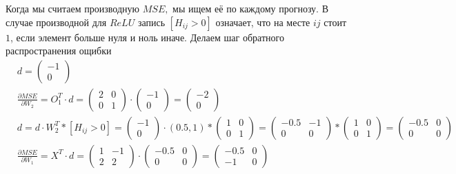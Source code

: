 \begin{sol}
Когда мы считаем производную $MSE,$ мы ищем её по каждому прогнозу. В случае производной для $ReLU$ запись $[H_{ij} > 0]$ означает, что на месте $ij$ стоит $1$, если элемент больше нуля и ноль иначе.  Делаем шаг обратного распространения ощибки
\begin{equation*}
    \begin{aligned} 
    & d = \begin{pmatrix} -1 \\ 0 \end{pmatrix} \\ 
    & \frac{\partial MSE}{\partial W_2} =  O_1^T \cdot d = \begin{pmatrix} 2 & 0 \\ 0 & 1 \end{pmatrix} \cdot \begin{pmatrix} -1 \\ 0 \end{pmatrix} = \begin{pmatrix} -2 \\ 0 \end{pmatrix}\\
    & d = d \cdot W_2^T * [H_{ij} > 0] = \begin{pmatrix} -1 \\ 0 \end{pmatrix}  \cdot (0.5, 1) * \begin{pmatrix} 1 & 0 \\ 0 & 1 \end{pmatrix} = \begin{pmatrix} -0.5 & -1 \\ 0 & 0 \end{pmatrix} * \begin{pmatrix} 1 & 0 \\ 0 & 1 \end{pmatrix} = \begin{pmatrix} -0.5 & 0 \\ 0 & 0 \end{pmatrix} \\
    & \frac{\partial MSE}{\partial W_1} =  X^T \cdot d = \begin{pmatrix} 1 & -1 \\ 2 & 2 \end{pmatrix} \cdot \begin{pmatrix} -0.5 & 0 \\ 0 & 0 \end{pmatrix} = \begin{pmatrix} -0.5 & 0 \\ -1 & 0 \end{pmatrix} \\
    \end{aligned}
\end{equation*}


\end{sol}
